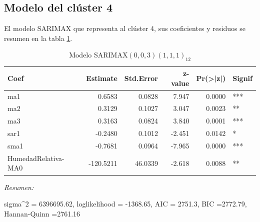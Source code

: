 \documentclass[12pt,oneside]{book}\usepackage[]{graphicx}\usepackage[]{color}
\newenvironment{knitrout}{}{} %
\theoremstyle{definition} %
\begin{document}
\subsection{Modelo del clúster 4}



El modelo SARIMAX que representa al clúster 4, sus coeficientes y residuos se resumen en la tabla \ref{tab:sarimax_cl4}.




\begin{knitrout}
\color{fgcolor}\begin{table}

\caption{\label{tab:unnamed-chunk-114}\label{tab:sarimax_cl4}Modelo SARIMAX$(0,0,3)(1,1,1)_{12}$}
\centering
\begin{threeparttable}
\begin{tabular}[t]{lrrrrl}
\toprule
Coef & Estimate & Std.Error & z-value & Pr(>|z|) & Signif\\
\midrule
\rowcolor{gray!6}  ma1 & 0.6583 & 0.0828 & 7.947 & 0.0000 & ***\\
ma2 & 0.3129 & 0.1027 & 3.047 & 0.0023 & **\\
\rowcolor{gray!6}  ma3 & 0.3163 & 0.0824 & 3.840 & 0.0001 & ***\\
sar1 & -0.2480 & 0.1012 & -2.451 & 0.0142 & *\\
\rowcolor{gray!6}  sma1 & -0.7681 & 0.0964 & -7.965 & 0.0000 & ***\\
\addlinespace
HumedadRelativa-MA0 & -120.5211 & 46.0339 & -2.618 & 0.0088 & **\\
\bottomrule
\end{tabular}
\begin{tablenotes}
\item \textit{Resumen:} 
\item sigma\textasciicircum{}2 = 6396695.62, loglikelihood = -1368.65, AIC = 2751.3, BIC =2772.79, Hannan-Quinn =2761.16
\end{tablenotes}
\end{threeparttable}
\end{table}


\end{knitrout}
\end{document}
